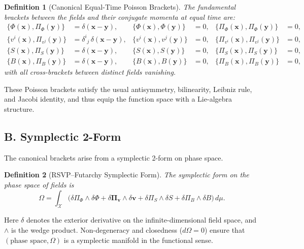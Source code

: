 \documentclass[12pt]{article}
\newtheorem{definition}{Definition}
\begin{document}
\begin{definition}[Canonical Equal-Time Poisson Brackets]
The fundamental brackets between the fields and their conjugate
momenta at equal time are:
\begin{align}
\{\Phi(\mathbf{x}), \Pi_\Phi(\mathbf{y})\}
    &= \delta(\mathbf{x}-\mathbf{y}), &
\{\Phi(\mathbf{x}), \Phi(\mathbf{y})\} &= 0, &
\{\Pi_\Phi(\mathbf{x}), \Pi_\Phi(\mathbf{y})\} &= 0,
\\[4pt]
\{v^i(\mathbf{x}), \Pi_{v^j}(\mathbf{y})\}
    &= \delta^i{}_j\,\delta(\mathbf{x}-\mathbf{y}), &
\{v^i(\mathbf{x}), v^j(\mathbf{y})\} &= 0, &
\{\Pi_{v^i}(\mathbf{x}), \Pi_{v^j}(\mathbf{y})\} &= 0,
\\[4pt]
\{S(\mathbf{x}), \Pi_S(\mathbf{y})\}
    &= \delta(\mathbf{x}-\mathbf{y}), &
\{S(\mathbf{x}), S(\mathbf{y})\} &= 0, &
\{\Pi_S(\mathbf{x}), \Pi_S(\mathbf{y})\} &= 0,
\\[4pt]
\{B(\mathbf{x}), \Pi_B(\mathbf{y})\}
    &= \delta(\mathbf{x}-\mathbf{y}), &
\{B(\mathbf{x}), B(\mathbf{y})\} &= 0, &
\{\Pi_B(\mathbf{x}), \Pi_B(\mathbf{y})\} &= 0,
\end{align}
with all cross-brackets between distinct fields vanishing.
\end{definition}

These Poisson brackets satisfy the usual antisymmetry, bilinearity, 
Leibniz rule, and Jacobi identity, and thus equip the function space
with a Lie-algebra structure.

\subsection*{B. Symplectic 2-Form}

The canonical brackets arise from a symplectic 2-form on phase space.

\begin{definition}[RSVP--Futarchy Symplectic Form]
The symplectic form on the phase space of fields is
\begin{equation}
\Omega
=
\int_{\mathcal{X}}
\Big(
    \delta \Pi_\Phi \wedge \delta \Phi
  + \delta \bm{\Pi}_{\mathbf{v}} \wedge \delta \mathbf{v}
  + \delta \Pi_S \wedge \delta S
  + \delta \Pi_B \wedge \delta B
\Big)\, d\mu.
\end{equation}
\end{definition}

Here $\delta$ denotes the exterior derivative on the infinite-dimensional 
field space, and $\wedge$ is the wedge product. Non-degeneracy and
closedness ($d\Omega=0$) ensure that $(\text{phase space},\Omega)$ is a
symplectic manifold in the functional sense.
\end{document}
